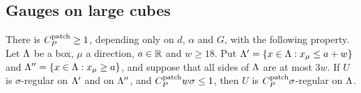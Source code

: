 \subsection{Gauges on large cubes}\label{ss:28.2}

\begin{lemma}[Patching]\label{lem:patching}
There is $C^{\rm patch}_P\ge1$, depending only on $d$, $\alpha$ and $G$, with the following property. Let $\Lambda$ be a box, $\mu$ a direction, $a\in\mathbb R$ and $w\ge18$. Put $\Lambda'=\{x\in\Lambda:x_\mu\le a+w\}$ and $\Lambda''=\{x\in\Lambda:x_\mu\ge a\}$, and suppose that all sides of $\Lambda$ are at most $3w$. If $U$ is $\sigma$-regular on $\Lambda'$ and on $\Lambda''$, and $C^{\rm patch}_Pw\sigma\le1$, then $U$ is $C^{\rm patch}_P\sigma$-regular on $\Lambda$.
\end{lemma}


